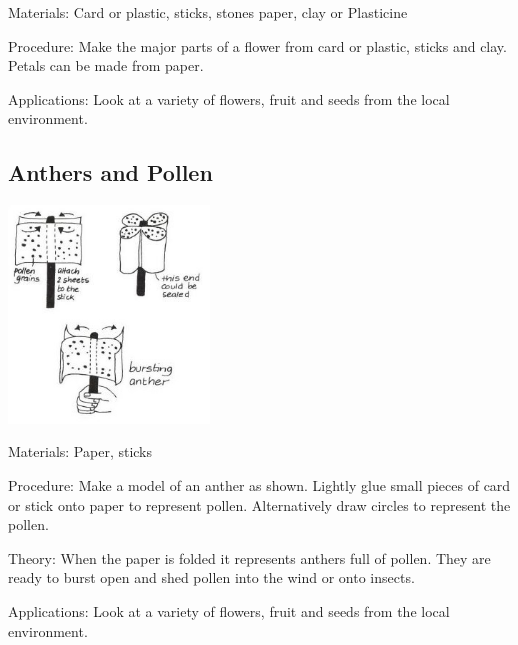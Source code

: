 \begin{multicols}{2}
\begin{description*}
\item[Materials:]{Card or plastic, sticks, stones paper, clay or Plasticine}
\item[Procedure:]{Make the major parts of a flower from card or plastic, sticks and clay.
Petals can be made from paper.}
\item[Applications:]{Look at a variety of flowers, fruit and seeds from the local environment.}
\end{description*}

\subsection{Anthers and Pollen}

\begin{center}
\includegraphics[width=0.4\textwidth]{./img/vso/anthers-pollen.jpg}
\end{center}

\begin{description*}
\item[Materials:]{Paper, sticks}
\item[Procedure:]{Make a model of an anther as shown. Lightly glue small pieces of card
or stick onto paper to represent pollen. Alternatively draw circles to
represent the pollen. }
\item[Theory:]{When the paper is folded it represents anthers
full of pollen. They are ready to burst open and shed pollen into the
wind or onto insects.}
\item[Applications:]{Look at a variety of flowers, fruit and seeds from the local environment.}
\end{description*}


\end{multicols}
